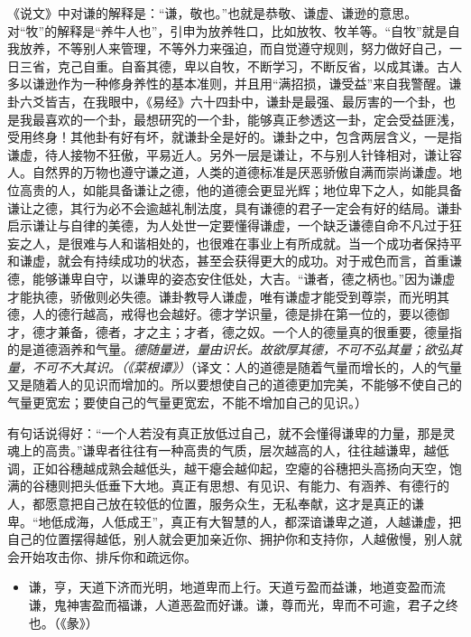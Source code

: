 《说文》中对谦的解释是：“谦，敬也。”也就是恭敬、谦虚、谦逊的意思。对“牧”的解释是“养牛人也”，引申为放养牲口，比如放牧、牧羊等。“自牧”就是自我放养，不等别人来管理，不等外力来强迫，而自觉遵守规则，努力做好自己，一日三省，克己自重。自畜其德，卑以自牧，不断学习，不断反省，以成其谦。古人多以谦逊作为一种修身养性的基本准则，并且用“满招损，谦受益”来自我警醒。谦卦六爻皆吉，在我眼中，《易经》六十四卦中，谦卦是最强、最厉害的一个卦，也是我最喜欢的一个卦，最想研究的一个卦，能够真正参透这一卦，定会受益匪浅，受用终身！其他卦有好有坏，就谦卦全是好的。谦卦之中，包含两层含义，一是指谦虚，待人接物不狂傲，平易近人。另外一层是谦让，不与别人针锋相对，谦让容人。自然界的万物也遵守谦之道，人类的道德标准是厌恶骄傲自满而崇尚谦虚。地位高贵的人，如能具备谦让之德，他的道德会更显光辉；地位卑下之人，如能具备谦让之德，其行为必不会逾越礼制法度，具有谦德的君子一定会有好的结局。谦卦启示谦让与自律的美德，为人处世一定要懂得谦虚，一个缺乏谦德自命不凡过于狂妄之人，是很难与人和谐相处的，也很难在事业上有所成就。当一个成功者保持平和谦虚，就会有持续成功的状态，甚至会获得更大的成功。对于戒色而言，首重谦德，能够谦卑自守，以谦卑的姿态安住低处，大吉。“谦者，德之柄也。”因为谦虚才能执德，骄傲则必失德。谦卦教导人谦虚，唯有谦虚才能受到尊崇，而光明其德，人的德行越高，戒得也会越好。德才学识量，德是排在第一位的，要以德御才，德才兼备，德者，才之主；才者，德之奴。一个人的德量真的很重要，德量指的是道德涵养和气量。\textit{德随量进，量由识长。故欲厚其德，不可不弘其量；欲弘其量，不可不大其识。（《菜根谭》）}（译文：人的道德是随着气量而增长的，人的气量又是随着人的见识而增加的。所以要想使自己的道德更加完美，不能够不使自己的气量更宽宏；要使自己的气量更宽宏，不能不增加自己的见识。）

有句话说得好：“一个人若没有真正放低过自己，就不会懂得谦卑的力量，那是灵魂上的高贵。”谦卑者往往有一种高贵的气质，层次越高的人，往往越谦卑，越低调，正如谷穗越成熟会越低头，越干瘪会越仰起，空瘪的谷穗把头高扬向天空，饱满的谷穗则把头低垂下大地。真正有思想、有见识、有能力、有涵养、有德行的人，都愿意把自己放在较低的位置，服务众生，无私奉献，这才是真正的谦卑。“地低成海，人低成王”，真正有大智慧的人，都深谙谦卑之道，人越谦虚，把自己的位置摆得越低，别人就会更加亲近你、拥护你和支持你，人越傲慢，别人就会开始攻击你、排斥你和疏远你。

\begin{itemize}
    \item 谦，亨，天道下济而光明，地道卑而上行。天道亏盈而益谦，地道变盈而流谦，鬼神害盈而福谦，人道恶盈而好谦。谦，尊而光，卑而不可逾，君子之终也。（《彖》）
\end{itemize}

